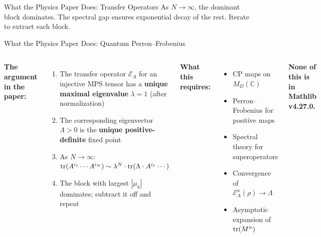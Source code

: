\documentclass[aspectratio=169,10pt]{beamer}
\begin{document}
\begin{frame}{What the Physics Paper Does: Transfer Operators}
\vspace{0.3em}
{\small As $N \to \infty$, the dominant block dominates. The spectral gap ensures exponential decay of the rest. Iterate to extract each block.}
\end{frame}

\begin{frame}{What the Physics Paper Does: Quantum Perron--Frobenius}
\vspace{-0.3em}
\begin{columns}[T]
{\small\textbf{The argument in the paper:}}
\begin{enumerate}\itemsep0.15em
  \item {\small The transfer operator $\mathcal{E}_A$ for an injective MPS tensor has a \textbf{unique maximal eigenvalue} $\lambda = 1$ (after normalization)}
  \item {\small The corresponding eigenvector $\Lambda > 0$ is the \textbf{unique positive-definite} fixed point}
  \item {\small As $N \to \infty$:
  $ \mathrm{tr}(A^{i_1} \cdots A^{i_N}) \sim \lambda^N \cdot \mathrm{tr}(\Lambda \cdot A^{i_1} \cdots)$}
  \item {\small The block with largest $|\mu_k|$ dominates; subtract it off and repeat}
\end{enumerate}

{\small\textbf{What this requires:}}
\begin{itemize}\itemsep0.1em
  \item[\textcolor{softred}{$\boldsymbol{\times}$}] {\small CP maps on $M_D(\mathbb{C})$}
  \item[\textcolor{softred}{$\boldsymbol{\times}$}] {\small Perron--Frobenius for positive maps}
  \item[\textcolor{softred}{$\boldsymbol{\times}$}] {\small Spectral theory for superoperators}
  \item[\textcolor{softred}{$\boldsymbol{\times}$}] {\small Convergence of $\mathcal{E}_A^n(\rho) \to \Lambda$}
  \item[\textcolor{softred}{$\boldsymbol{\times}$}] {\small Asymptotic expansion of $\mathrm{tr}(M^n)$}
\end{itemize}

\vspace{0.3em}
{\small \textcolor{softred}{\textbf{None of this is in Mathlib v4.27.0.}}}
\end{columns}


\end{frame}
\end{document}
